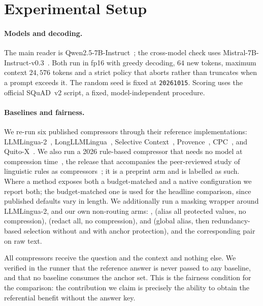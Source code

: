\section{Experimental Setup}
\label{sec:setup}

\paragraph{Models and decoding.}
The main reader is Qwen2.5-7B-Instruct~\cite{qwen25}; the cross-model check uses
Mistral-7B-Instruct-v0.3~\cite{mistral7b}. Both run in fp16 with greedy decoding,
$64$ new tokens, maximum context $24{,}576$ tokens and a strict policy that aborts rather
than truncates when a prompt exceeds it. The random seed is fixed at \texttt{20261015}.
Scoring uses the official SQuAD~v2 script, a fixed, model-independent procedure.

\paragraph{Baselines and fairness.}
We re-run six published compressors through their reference implementations:
LLMLingua-2~\cite{llmlingua2}, LongLLMLingua~\cite{longllmlingua}, Selective
Context~\cite{selective_context}, Provence~\cite{provence}, CPC~\cite{cpc}, and
Quito-X~\cite{quitox}. We also run a 2026 rule-based compressor that needs no model at
compression time~\cite{chokshi-lexical-2026}, the release that accompanies the
peer-reviewed study of linguistic rules as compressors~\cite{ma-linguistic-2026};
it is a preprint arm and is labelled as such. Where a method exposes both a
budget-matched and a native configuration we report both; the budget-matched one is used for the headline comparison,
since published defaults vary in length. We additionally run a masking wrapper around
LLMLingua-2, and our own non-routing arms: ,
 (alias all protected values, no compression),  (redact all, no
compression),  and  (global alias, then
redundancy-based selection without and with anchor protection), and the corresponding
 pair on raw text.

All compressors receive the question and the context and nothing else. We verified in the
runner that the reference answer is never passed to any baseline, and that no baseline
consumes the anchor set. This is the fairness condition for the comparison: the
contribution we claim is precisely the ability to obtain the referential benefit without
the answer key.

